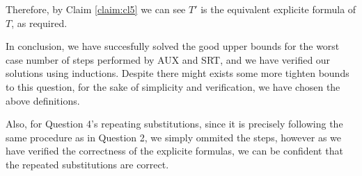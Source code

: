 \documentclass[11pt, sakura, night, 1in]{hw}
\begin{document}
Therefore, by Claim \ref{claim:cl5} we can see $T'$ is the equivalent explicite formula of $T$, as required.

In conclusion, we have succesfully solved the good upper bounds for the worst case number of steps performed by AUX and SRT, and we have verified our solutions using inductions. Despite there might exists some more tighten bounds to this question, for the sake of simplicity and verification, we have chosen the above definitions.

Also, for Question 4's repeating substitutions, since it is precisely following the same procedure as in Question 2, we simply ommited the steps, however as we have verified the correctness of the explicite formulas, we can be confident that the repeated substitutions are correct.
\end{document}
